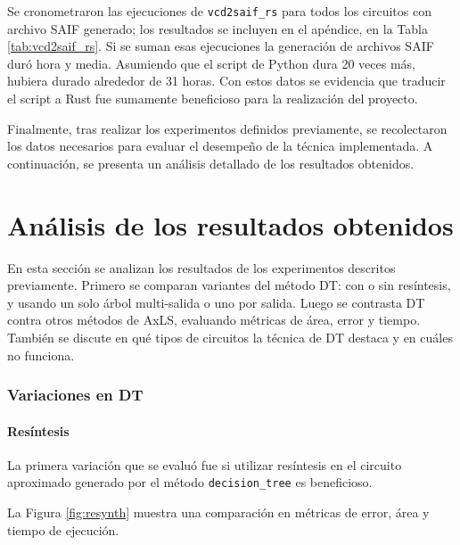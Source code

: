 Se cronometraron las ejecuciones de \texttt{vcd2saif\_rs} para todos los
circuitos con archivo SAIF generado; los resultados se incluyen en el apéndice,
en la Tabla \ref{tab:vcd2saif_rs}.
Si se suman esas ejecuciones la generación de archivos SAIF duró hora y media.
Asumiendo que el script de Python dura 20 veces más, hubiera durado alrededor
de 31 horas. Con estos datos se evidencia que traducir el script a Rust fue
sumamente beneficioso para la realización del proyecto.

Finalmente, tras realizar los experimentos definidos previamente, se
recolectaron los datos necesarios para evaluar el desempeño de la técnica
implementada. A continuación, se presenta un análisis detallado de los
resultados obtenidos.

\section{Análisis de los resultados obtenidos}

En esta sección se analizan los resultados de los experimentos descritos
previamente. Primero se comparan variantes del método DT: con o sin resíntesis,
y usando un solo árbol multi-salida o uno por salida. Luego se contrasta DT
contra otros métodos de AxLS, evaluando métricas de área, error y tiempo.
También se discute en qué tipos de circuitos la técnica de DT destaca y en
cuáles no funciona.

\subsubsection{Variaciones en DT}

\paragraph{Resíntesis}

La primera variación que se evaluó fue si utilizar resíntesis en el circuito
aproximado generado por el método \texttt{decision\_tree} es beneficioso.

La Figura \ref{fig:resynth} muestra una comparación en métricas de error, área y
tiempo de ejecución.

